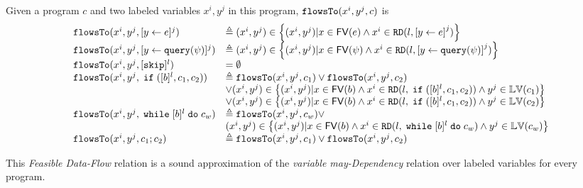 \begin{defn}
 \label{def:feasible_flowsto}
 Given a program $c$ and two labeled variables $x^i, y^j$ in this program, 
 $\mathtt{flowsTo}(x^i, y^j, c)$ is 
 {\small
 \[
 \begin{array}{ll}
 \flowsto(x^i, y^j, \clabel{\assign{y}{\expr}}{}^j) 
 & \triangleq (x^i, y^j) \in \left\{ (x^i, y^j) | x \in \mathsf{FV}(\expr) 
 \land x^i \in \live(l, \clabel{\assign{y}{\expr}}^j) \right\} \\
 \flowsto(x^i, y^j, \clabel{\assign{y}{\query(\qexpr)}}{}^j) 
 & \triangleq (x^i, y^j) \in \left\{ (x^i, y^j) | x \in \mathsf{FV}(\qexpr) 
 \land x^i \in \live(l,\clabel{\assign{y}{\query(\qexpr)}}^j) \right\} \\
 \flowsto(x^i, y^j, [\eskip]^{l}) & = \emptyset \\
 \flowsto(x^i, y^j, \eif ([b]^l, c_1, c_2)) & \triangleq \flowsto(x^i, y^j, c_1) \lor \flowsto(x^i, y^j, c_2) \\ 
 & \lor (x^i, y^j) \in
 \left\{(x^i,y^j) | x \in \mathsf{FV}(b) \land 
 x^i \in \live(l, \eif ([b]^l, c_1, c_2)) \land y^j \in \lvar(c_1) \right\} \\
 &\lor (x^i, y^j) \in \left\{(x^i,y^j) | x \in \mathsf{FV}(b) \land 
 x^i\in \live(l, \eif ([b]^l, c_1, c_2)) \land y^j \in \lvar(c_2) \right\} \\
 \flowsto(x^i, y^j, \ewhile [b]^l \edo c_w) & \triangleq \flowsto(x^i, y^j, c_w) \lor
 \\ & 
 (x^i, y^j) \in \left\{(x^i,y^j) | x \in \mathsf{FV}(b) \land 
 x^i \in \live(l, \ewhile [b]^l \edo c_w) \land y^j \in \lvar(c_w) \right\} \\
 \flowsto(x^i, y^j, c_1 ;c_2) & \triangleq \flowsto(x^i, y^j, c_1) \lor \flowsto(x^i, y^j, c_2) \\
 \end{array}
 \]
 }
 \end{defn}
%
This \emph{Feasible Data-Flow} relation is a sound approximation 
of the \emph{variable may-Dependency} relation over labeled variables for every program.
